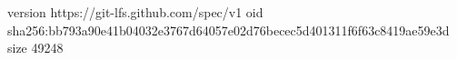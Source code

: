 version https://git-lfs.github.com/spec/v1
oid sha256:bb793a90e41b04032e3767d64057e02d76becec5d401311f6f63c8419ae59e3d
size 49248
